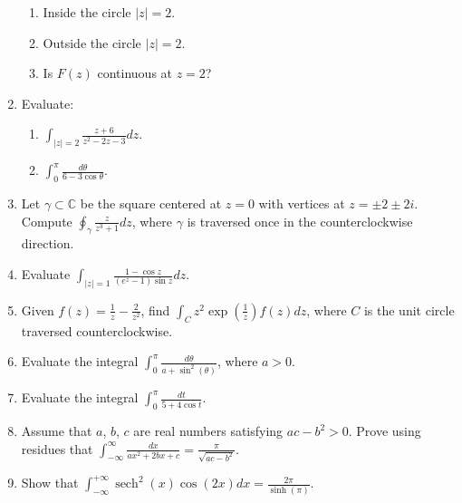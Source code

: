 \documentclass[a4paper,10pt]{article}
\begin{document}
\begin{enumerate}
\begin{enumerate}
	\item Inside the circle $|z| = 2$.
	\item Outside the circle $|z| = 2$.
	\item Is $F(z)$ continuous at $z = 2$?
\end{enumerate}
	

\item 
	
	Evaluate:
	
	\begin{enumerate}
	\item $\int_{|z|=2}\frac{z+6}{z^{2}-2z-3}dz$.
	
	\item $\int_{0}^{\pi}\frac{d\theta}{6-3\cos\theta}$.
	\end{enumerate}
	
\item 
	
	Let $\gamma \subset \mathbb{C}$ be the square centered at $z = 0$ with vertices at $z = \pm 2 \pm 2i$. Compute $\oint_{\gamma}\frac{z}{z^{3}+1}dz$, where $\gamma$ is traversed once in the counterclockwise direction.
	
\item 
	
	Evaluate $\int_{|z|=1}\frac{1-\cos z}{(e^{z}-1)\sin z}dz$.
	
\item 
	
	Given $f(z) = \frac{1}{z} - \frac{2}{z^{2}}$, find $\int_{C}z^{2}\exp(\frac{1}{z})f(z)dz$, where $C$ is the unit circle traversed counterclockwise.
	
\item 
	
	Evaluate the integral $\int_{0}^{\pi}\frac{d\theta}{a+\sin^{2}(\theta)}$, where $a > 0$.
	
\item 
	
	Evaluate the integral $\int_{0}^{\pi}\frac{dt}{5+4\cos t}$.
	
\item 
	
	Assume that $a$, $b$, $c$ are real numbers satisfying $ac - b^{2} > 0$. Prove using residues that $\int_{-\infty}^{\infty}\frac{dx}{ax^{2}+2bx+c} = \frac{\pi}{\sqrt{ac-b^{2}}}$.
	
\item 
	
	Show that $\int_{-\infty}^{+\infty}\operatorname{sech}^{2}(x)\cos(2x)dx = \frac{2\pi}{\sinh(\pi)}$.
	

\end{enumerate}
\end{document}
